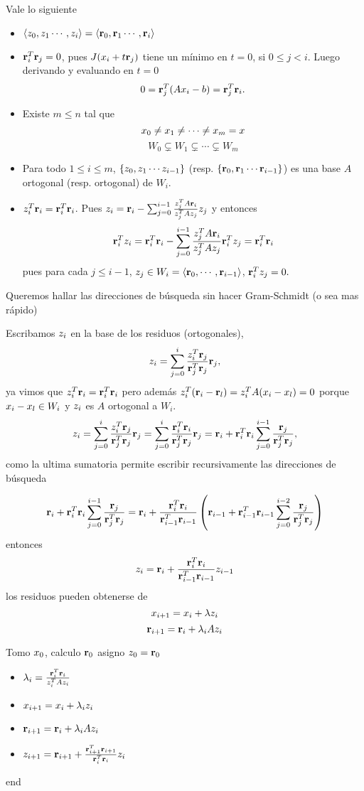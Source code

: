 Vale lo siguiente
\begin{itemize}
 \item $\langle \zb_0, \zb_1\cdots ,\zb_i\rangle =\langle \rb_0, \rb_1\cdots ,
 \rb_i\rangle$
\item $\mathbf{r}_i^T\mathbf{r}_j=0$, pues $J(\xb_i+t\rb_j)$ tiene un mínimo en $t=0$, si $0\le j<i$. Luego derivando y evaluando en $t=0$
$$
0=\rb_j^T(\Ab\xb_i-\bb)=\rb_j^T\rb_i.
$$
\item Existe $m\le n$ tal que 
$$
\xb_0\neq \xb_1\neq \cdots \neq \xb_m= \xb
$$
$$
W_{0}\subsetneq W_1\subsetneq \cdots \subsetneq W_m
$$
 
\item Para todo $1\le i\le m$, $\{ \zb_0,\zb_1\cdots \zb_{i-1}\}$ (resp. $\{ \mathbf{r}_0,\mathbf{r}_1\cdots \mathbf{r}_{i-1}\}$) es una base $A$ ortogonal (resp. ortogonal) de $W_i$.
 \item $\zb_i^T\rb_i=\rb_i^T\rb_i$. Pues 
 $\zb_i=\rb_i-\sum_{j=0}^{i-1}\frac{\zb_j^T\Ab\rb_i}{\zb_j^T\Ab\zb_j}\zb_j$ y entonces 
 $$\rb_i^T\zb_i=\rb_i^T\rb_i-\sum_{j=0}^{i-1}\frac{\zb_j^T\Ab\rb_i}{\zb_j^T\Ab\zb_j}\rb_i^T\zb_j=\rb_i^T\rb_i$$
 pues para cada $j\le i-1$,
 $\zb_j\in W_i=\langle \rb_0,\cdots,\rb_{i-1}\rangle$, $\rb_i^T\zb_j=0.$ 
 \end{itemize}


 Queremos hallar las direcciones de búsqueda sin hacer Gram-Schmidt (o sea mas rápido)

Escribamos $\zb_i$ en la base de los residuos (ortogonales), 
$$
\zb_i=\sum_{j=0}^{i}\frac{\zb_i^T\rb_j}{\rb_j^T\rb_j}\rb_j,
$$
ya vimos que
$\zb_i^T\rb_i=\rb_i^T\rb_i$
pero además
$\zb_i^T(\rb_i-\rb_l)=\zb_i^T\Ab(\xb_i-\xb_l)=0$ porque $\xb_i-\xb_l\in W_i$ y $\zb_i$ es $A$ ortogonal a $W_i$.
$$
\zb_i=\sum_{j=0}^{i}\frac{\zb_i^T\rb_j}{\rb_j^T\rb_j}\rb_j=\sum_{j=0}^{i}\frac{\rb_i^T\rb_i}{\rb_j^T\rb_j}\rb_j=\rb_i + \rb_i^T\rb_i\sum_{j=0}^{i-1}\frac{\rb_j}{\rb_j^T\rb_j},
$$
como la ultima sumatoria permite escribir recursivamente las direcciones de búsqueda

$$
\mathbf{r}_i + \mathbf{r}_i^T\mathbf{r}_i\sum_{j=0}^{i-1}\frac{\mathbf{r}_j}{\mathbf{r}_j^T\mathbf{r}_j}=\mathbf{r}_i + \frac{\mathbf{r}_i^T\mathbf{r}_i}{\mathbf{r}_{i-1}^T\mathbf{r}_{i-1}}\left( \mathbf{r}_{i-1}+\mathbf{r}_{i-1}^T\mathbf{r}_{i-1}\sum_{j=0}^{i-2}\frac{\mathbf{r}_j}{\mathbf{r}_j^T\mathbf{r}_j}\right)
$$
entonces
$$
\zb_i=\rb_i+\frac{\rb_i^T\rb_i}{\rb_{i-1}^T\rb_{i-1}}\zb_{i-1}
$$
los residuos  pueden obtenerse de 
$$\xb_{i+1}=\xb_i+\lambda \zb_i$$ 
$$
\rb_{i+1}=\rb_i+\lambda_i\Ab\zb_i
$$

Tomo $\xb_0$, calculo $\mathbf{r}_0$ asigno $\zb_0=\rb_0$

\begin{itemize}
 \item $\lambda_i=\frac{\rb_i^T\rb_i}{\zb_{i}^T\Ab\zb_i}$
 \item $\xb_{i+1}=\xb_{i}+\lambda_i \zb_i$
 \item $\rb_{i+1}=\rb_i+\lambda_i\Ab\zb_i$
\item $
\zb_{i+1}=\rb_{i+1}+\frac{\rb_{i+1}^T\rb_{i+1}}{\rb_{i}^T\rb_{i}}\zb_{i}
$

\end{itemize}
end

